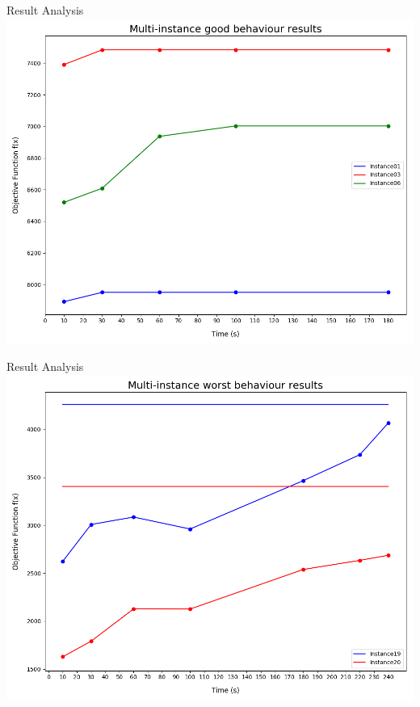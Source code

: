 \documentclass[12pt]{beamer}
\begin{document}
  \begin{frame}[fragile]{Result Analysis}
    \includegraphics[scale=0.4]{res/goodInstances}
  \end{frame}

  \begin{frame}[fragile]{Result Analysis}
    \includegraphics[scale=0.4]{res/badInstances}
  \end{frame}
\end{document}
